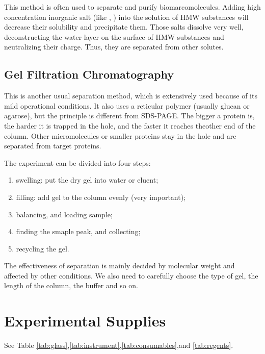 This method is often used to separate and purify biomarcomolecules. Adding high concentration inorganic salt (like , ) into the solution of HMW substances will
decrease their solubility and precipitate them. Those salts dissolve very well, deconstructing
the water layer on the surface of HMW substances and neutralizing their charge. Thus, they are
separated from other solutes.

\subsection{Gel Filtration Chromatography}

This is another usual separation method, which is extensively used because of its mild operational conditions. It also uses a reticular polymer (usually glucan or agarose), but the principle is different from SDS-PAGE. The bigger a protein is, the harder it is trapped in the hole, and the faster it reaches theother end of the column. Other micromolecules or smaller proteins stay in the hole and are separated from target proteins. 

The experiment can be divided into four steps:
\begin{enumerate}
\item swelling: put the dry gel into water or eluent;
\item filling: add gel to the column evenly (very important);
\item balancing, and loading sample;
\item finding the smaple peak, and collecting;
\item recycling the gel.
\end{enumerate}

The effectiveness of separation is mainly decided by molecular weight and affected by other conditions. We also need to carefully choose the type of gel, the length of the column, the buffer and so on. 

\section{Experimental Supplies}
See Table \ref{tab:glass},\ref{tab:instrument},\ref{tab:consumables},and \ref{tab:regents}.

